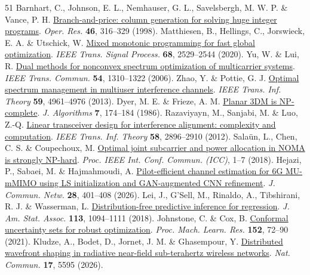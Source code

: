 \documentclass[lineno,pdflatex,sn-nature]{sn-jnl}
\providecommand{\DIFdelend}{} %
\DeclareRobustCommand{\DIFdelend}{\DIFOaddend \let\includegraphics\DIFOincludegraphics} %
\begin{document}
\begin{thebibliography}{51}
{}\DIFdelend {} Barnhart, C., Johnson, E. L., Nemhauser, G. L., Savelsbergh, M. W. P. \& Vance, P. H. \href{https://doi.org/10.1287/opre.46.3.316}{Branch-and-price: column generation for solving huge integer programs}. \emph{Oper. Res.} \textbf{46}, 316–329 (1998).
 Matthiesen, B., Hellings, C., Jorswieck, E. A. \& Utschick, W. \href{https://doi.org/10.1109/TSP.2020.2983284}{Mixed monotonic programming for fast global optimization}. \emph{IEEE Trans. Signal Process.} \textbf{68}, 2529–2544 (2020).
 Yu, W. \& Lui, R. \href{https://doi.org/10.1109/TCOMM.2006.877962}{Dual methods for nonconvex spectrum optimization of multicarrier systems}. \emph{IEEE Trans. Commun.} \textbf{54}, 1310–1322 (2006).
 Zhao, Y. \& Pottie, G. J. \href{https://doi.org/10.1109/TIT.2013.2255731}{Optimal spectrum management in multiuser interference channels}. \emph{IEEE Trans. Inf. Theory} \textbf{59}, 4961–4976 (2013).
 Dyer, M. E. \& Frieze, A. M. \href{https://doi.org/10.1016/0196-6774(86)90002-7}{Planar 3DM is NP-complete}. \emph{J. Algorithms} \textbf{7}, 174–184 (1986).
 Razaviyayn, M., Sanjabi, M. \& Luo, Z.-Q. \href{https://doi.org/10.1109/TIT.2012.2184909}{Linear transceiver design for interference alignment: complexity and computation}. \emph{IEEE Trans. Inf. Theory} \textbf{58}, 2896–2910 (2012).
 Salaün, L., Chen, C. S. \& Coupechoux, M. \href{https://doi.org/10.1109/ICC.2018.8422362}{Optimal joint subcarrier and power allocation in NOMA is strongly NP-hard}. \emph{Proc. IEEE Int. Conf. Commun. (ICC)}, 1–7 (2018).
 Hejazi, P., Sabaei, M. \& Hajmahmoudi, A. \href{https://doi.org/10.23919/JCN.2025.000112}{Pilot-efficient channel estimation for 6G MU-mMIMO using LS initialization and GAN-augmented CNN refinement}. \emph{J. Commun. Netw.} \textbf{28}, 401–408 (2026).
 Lei, J., G’Sell, M., Rinaldo, A., Tibshirani, R. J. \& Wasserman, L. \href{https://doi.org/10.1080/01621459.2017.1307116}{Distribution-free predictive inference for regression}. \emph{J. Am. Stat. Assoc.} \textbf{113}, 1094–1111 (2018).
 Johnstone, C. \& Cox, B. \href{https://proceedings.mlr.press/v152/johnstone21a.html}{Conformal uncertainty sets for robust optimization}. \emph{Proc. Mach. Learn. Res.} \textbf{152}, 72–90 (2021).
 Kludze, A., Bodet, D., Jornet, J. M. \& Ghasempour, Y. \href{https://doi.org/10.1038/s41467-026-71793-2}{Distributed wavefront shaping in radiative near-field sub-terahertz wireless networks}. \emph{Nat. Commun.} \textbf{17}, 5595 (2026).

\end{thebibliography}
\end{document}
